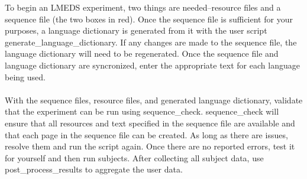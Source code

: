 To begin an LMEDS experiment, two things are needed--resource files and a sequence file (the two boxes in red).  Once the sequence file is sufficient for your purposes, a language dictionary is generated from it with the user script generate\_language\_dictionary.  If any changes are made to the sequence file, the language dictionary will need to be regenerated.  Once the sequence file and language dictionary are syncronized, enter the appropriate text for each language being used.

\paragraph{}
With the sequence files, resource files, and generated language dictionary, validate that the experiment can be run using sequence\_check.  sequence\_check will ensure that all resources and text specified in the sequence file are available and that each page in the sequence file can be created.  As long as there are issues, resolve them and run the script again.  Once there are no reported errors, test it for yourself and then run subjects.  After collecting all subject data, use post\_process\_results to aggregate the user data.



